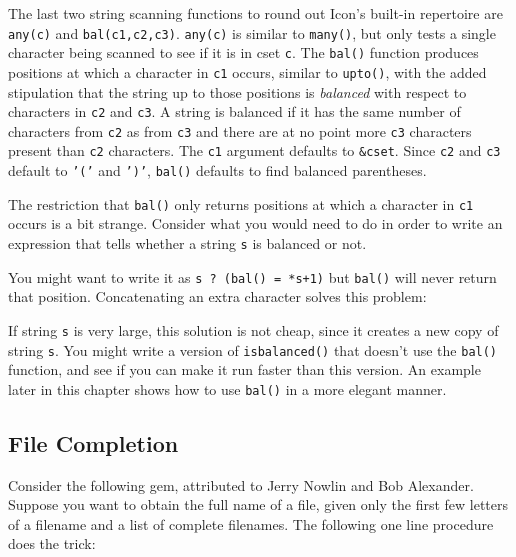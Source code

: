 The last two string scanning functions to round out
Icon's built-in repertoire are
\texttt{any(c)} and \texttt{bal(c1,c2,c3)}.
\texttt{any(c)} is similar to \texttt{many()}, but only tests a single
character being scanned to see if it is in cset \texttt{c}. The
\texttt{bal()} function produces positions at which a character in
\texttt{c1} occurs, similar to \texttt{upto()}, with the added
stipulation that the string up to those positions is \textit{balanced}
with respect to characters in \texttt{c2} and \texttt{c3}. A string is
balanced if it has the same number of characters from \texttt{c2} as
from \texttt{c3} and there are at no point more \texttt{c3} characters
present than \texttt{c2} characters. The \texttt{c1} argument defaults
to \texttt{\&cset}. Since \texttt{c2} and \texttt{c3} default to
\texttt{'('} and
\texttt{')'}, \texttt{bal()} defaults
to find balanced parentheses.

The restriction that \texttt{bal()} only returns positions at which a
character in \texttt{c1} occurs is a bit strange. Consider what you
would need to do in order to write an expression that tells whether a
string \texttt{s} is balanced or not.

You might want to write it as \texttt{s ? (bal() = *s+1)} but
\texttt{bal()} will never return that position. Concatenating an extra
character solves this problem:


If string \texttt{s} is very large, this solution is not cheap, since it
creates a new copy of string \texttt{s}. You might write a version of
\texttt{isbalanced()} that doesn't use the
\texttt{bal()} function, and see if you can make it run faster than
this version. An example later in this chapter shows how to use
\texttt{bal()} in a more elegant manner.

\subsection*{File Completion}

Consider the following gem, attributed to Jerry Nowlin and Bob Alexander. Suppose you want
to obtain the full name of a file, given only the first few letters of
a filename and a list of complete filenames.
The following one line procedure does the trick:

